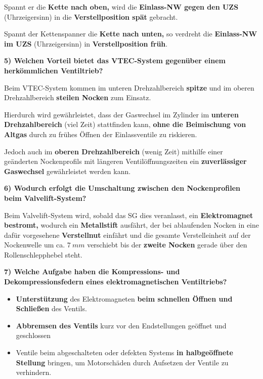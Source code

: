 Spannt er die \textbf{Kette nach oben,} wird die \textbf{Einlass-NW
gegen den UZS} (Uhrzeigersinn) in die \textbf{Verstellposition spät}
gebracht.

Spannt der Kettenspanner die \textbf{Kette nach unten,} so verdreht die
\textbf{Einlass-NW im UZS} (Uhrzeigersinn) in \textbf{Verstellposition
früh}.

\textbf{5) Welchen Vorteil bietet das VTEC-System gegenüber einem
herkömmlichen Ventiltrieb?}

Beim VTEC-System kommen im unteren Drehzahlbereich \textbf{spitze} und
im oberen Drehzahlbereich \textbf{steilen Nocken} zum Einsatz.

Hierdurch wird gewährleistet, dass der Gaswechsel im Zylinder im
\textbf{unteren Drehzahlbereich} (viel Zeit) stattfinden kann,
\textbf{ohne die Beimischung von Altgas} durch zu frühes Öffnen der
Einlassventile zu riskieren.

Jedoch auch im \textbf{oberen Drehzahlbereich} (wenig Zeit) mithilfe
einer geänderten Nockenprofils mit längeren Ventilöffnungszeiten ein
\textbf{zuverlässiger Gaswechsel} gewährleistet werden kann.

\textbf{6) Wodurch erfolgt die Umschaltung zwischen den Nockenprofilen
beim Valvelift-System?}

Beim Valvelift-System wird, sobald das SG dies veranlasst, ein
\textbf{Elektromagnet bestromt,} wodurch ein \textbf{Metallstift}
ausfährt, der bei ablaufenden Nocken in eine dafür vorgesehene
\textbf{Verstellnut} einfährt und die gesamte Verstelleinheit auf der
Nockenwelle um ca. $7~mm$ verschiebt bis der \textbf{zweite Nocken}
gerade über den Rollenschlepphebel steht.

\textbf{7) Welche Aufgabe haben die Kompressions- und
Dekompressionsfedern eines elektromagnetischen Ventiltriebs?}

\begin{itemize}
\item
  \textbf{Unterstützung} des Elektromagneten \textbf{beim schnellen
  Öffnen und Schließen} des Ventils.
\item
  \textbf{Abbremsen des Ventils} kurz vor den Endstellungen geöffnet und
  geschlossen
\item
  Ventile beim abgeschalteten oder defekten Systems \textbf{in
  halbgeöffnete Stellung} bringen, um Motorschäden durch Aufsetzen der
  Ventile zu verhindern.
\end{itemize}
